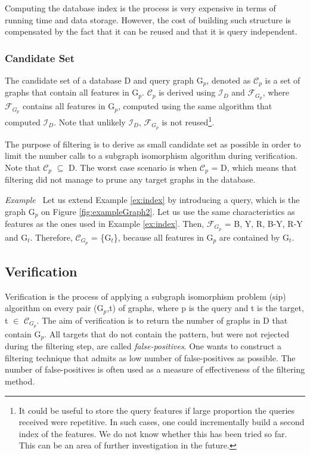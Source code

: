 \documentclass{l4proj}
\newcounter{example}[section]
\newenvironment{example}[1][]{\refstepcounter{example}\par\medskip
   \noindent \textit{Example~\theexample #1} \rmfamily}{\medskip}
\newcommand{\fancyI}{\mathcal{I}}
\newcommand{\fancyC}{\mathcal{C}}
\newcommand{\fancyF}{\mathcal{F}}
\begin{document}
Computing the database index is the process is very expensive in terms of running time and data storage. However, the cost of building such structure is compensated by the fact that it can be reused and that it is query independent.

\subsubsection{Candidate Set}
The candidate set of a database D and query graph G$_{p}$, denoted as $\fancyC_{p}$ is a set of graphs that contain all features in G$_{p}$. $\fancyC_{p}$ is derived using $\fancyI_{D}$ and $\fancyF_{G_{p}}$, where $\fancyF_{G_{p}}$ contains all features in G$_{p}$, computed using the same algorithm that computed $\fancyI_{D}$. Note that unlikely $\fancyI_{D}$, $\fancyF_{G_{p}}$ is not reused\footnote{It could be useful to store the query features if large proportion the queries received were repetitive. In such cases, one could incrementally build a second index of the features. We do not know whether this has been tried so far. This can be an area of further investigation in the future.}.

The purpose of filtering is to derive as small candidate set as possible in order to limit the number calls to a subgraph isomorphism algorithm during verification. Note that $\fancyC_{p}$ $\subseteq$ D. The worst case scenario is when $\fancyC_{p}$ = D, which means that filtering did not manage to prune any target graphs in the database.

\begin{example}
Let us extend Example \ref{ex:index} by introducing a query, which is the graph G$_{p}$ on Figure \ref{fig:exampleGraph2}. Let us use the same characteristics as features as the ones used in Example \ref{ex:index}. Then, $\fancyF_{G_{p}}$ = B, Y, R, B-Y, R-Y and G$_{t}$. Therefore, $\fancyC_{G_{p}}$ = \{G$_{t}$\}, because all features in G$_{p}$ are contained by G$_{t}$.
\end{example}

\subsection{Verification}
Verification is the process of applying a subgraph isomorphism problem (\gls{sip}) algorithm on every pair (G$_{p}$,t) of graphs, where p is the query and t is the target, t $\in$ $\fancyC_{G_{p}}$. The aim of verification is to return the number of graphs in D that contain G$_{p}$. All targets that do not contain the pattern, but were not rejected during the filtering step, are called \emph{false-positives}. One wants to construct a filtering technique that admits as low number of false-positives as possible. The number of false-positives is often used as a measure of effectiveness of the filtering method\cite{foteini}.
\end{document}
